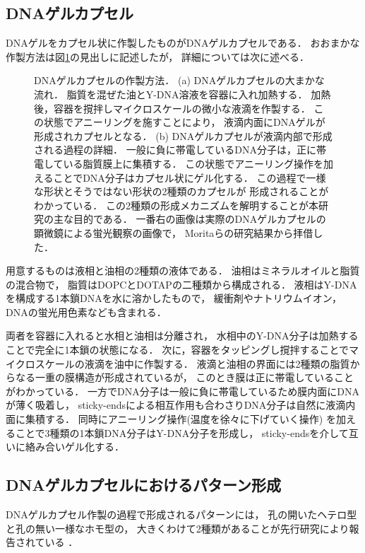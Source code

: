 \subsection{DNAゲルカプセル}
DNAゲルをカプセル状に作製したものがDNAゲルカプセルである．
おおまかな作製方法は図\ref{fig:capsule}の見出しに記述したが，
詳細については次に述べる．
\begin{figure}
    \centering
    
    \caption{DNAゲルカプセルの作製方法．
        (a) DNAゲルカプセルの大まかな流れ．
            脂質を混ぜた油とY-DNA溶液を容器に入れ加熱する．
            加熱後，容器を撹拌しマイクロスケールの微小な液滴を作製する．
            この状態でアニーリングを施すことにより，
            液滴内面にDNAゲルが形成されカプセルとなる．
        (b) DNAゲルカプセルが液滴内部で形成される過程の詳細．
            一般に負に帯電しているDNA分子は，正に帯電している脂質膜上に集積する．
            この状態でアニーリング操作を加えることでDNA分子はカプセル状にゲル化する．
            この過程で一様な形状とそうではない形状の2種類のカプセルが
            形成されることがわかっている\cite{moritasan}．
            この2種類の形成メカニズムを解明することが本研究の主な目的である．
            一番右の画像は実際のDNAゲルカプセルの顕微鏡による蛍光観察の画像で，
            Moritaらの研究結果から拝借した\cite{moritasan}．
    }
    \label{fig:capsule}
\end{figure}

用意するものは液相と油相の2種類の液体である．
油相はミネラルオイルと脂質の混合物で，
脂質はDOPCとDOTAPの二種類から構成される．
液相はY-DNAを構成する1本鎖DNAを水に溶かしたもので，
緩衝剤やナトリウムイオン，DNAの蛍光用色素なども含まれる．

両者を容器に入れると水相と油相は分離され，
水相中のY-DNA分子は加熱することで完全に1本鎖の状態になる．
次に，容器をタッピングし撹拌することでマイクロスケールの液滴を油中に作製する．
液滴と油相の界面には2種類の脂質からなる一重の膜構造が形成されているが，
このとき膜は正に帯電していることがわかっている\cite{morita2017formation}．
一方でDNA分子は一般に負に帯電しているため膜内面にDNAが薄く吸着し，
sticky-endsによる相互作用も合わさりDNA分子は自然に液滴内面に集積する．
同時にアニーリング操作(温度を徐々に下げていく操作)
を加えることで3種類の1本鎖DNA分子はY-DNA分子を形成し，
sticky-endsを介して互いに絡み合いゲル化する．


\subsection{DNAゲルカプセルにおけるパターン形成}
DNAゲルカプセル作製の過程で形成されるパターンには，
孔の開いたヘテロ型と孔の無い一様なホモ型の，
大きくわけて2種類があることが先行研究により報告されている
\cite{moritasan}．

